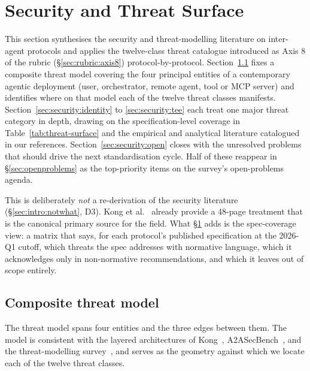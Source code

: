 \section{Security and Threat Surface}
\label{sec:security}

This section synthesises the security and threat-modelling
literature on inter-agent protocols and applies the twelve-class
threat catalogue introduced as Axis 8 of the rubric
(\S\ref{sec:rubric:axis8}) protocol-by-protocol.
Section~\ref{sec:security:model} fixes a composite threat model
covering the four principal entities of a contemporary agentic
deployment (user, orchestrator, remote agent, tool or MCP
server) and identifies where on that model each of the twelve
threat classes manifests.
Section~\ref{sec:security:identity} to \ref{sec:security:tee}
each treat one major threat category in depth, drawing on the
specification-level coverage in
Table~\ref{tab:threat-surface} and the empirical and analytical
literature catalogued in our references.
Section~\ref{sec:security:open} closes with the unresolved
problems that should drive the next standardisation cycle.
Half of these reappear in \S\ref{sec:openproblems} as the
top-priority items on the survey's open-problems agenda.

This is deliberately \emph{not} a re-derivation of the security
literature (\S\ref{sec:intro:notwhat}, D3). Kong et
al.~\cite{kong2025communication} already provide a 48-page
treatment that is the canonical primary source for the field.
What \S\ref{sec:security} adds is the spec-coverage view: a
matrix that says, for each protocol's published
specification at the 2026-Q1 cutoff, which threats the spec
addresses with normative language, which it acknowledges only
in non-normative recommendations, and which it leaves out of
scope entirely.

\subsection{Composite threat model}
\label{sec:security:model}

The threat model spans four entities and the three edges
between them. The model is consistent with the layered
architectures of
Kong~\cite{kong2025communication}, A2ASecBench~\cite{a2asecbench},
and the threat-modelling survey~\cite{threatmodel2026}, and
serves as the geometry against which we locate each of the
twelve threat classes.


